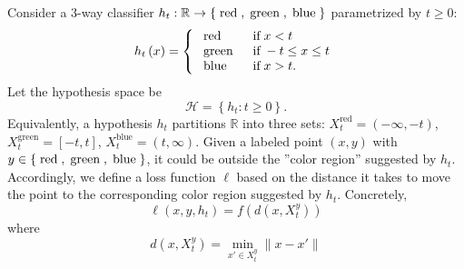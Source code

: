 \documentclass{article}
\def\H{\mathcal H}
\def\R{\mathbb R}
\begin{document}
\begin{figure}[H] \centering {} \label{fig:1dam}
\end{figure}
 Consider a 3-way classifier $h_t: \R \to  \left\{\text{\;red\;}, \text{\;green\;}, \text{\;blue\;}\right\} $ parametrized by $t\ge 0$:
 \begin{equation}
 h_{t}\left(x\right) =\left\{ \begin{array}{ll}
 \text{\;red\;}& \text{\;if\;} x < t  \\
 \text{\;green\;}& \text{\;if\;} -t \leq  x \leq  t \\
 \text{\;blue\;}& \text{\;if\;} x  > t. \\
 \end{array}\right. 
 \end{equation}
 Let the hypothesis space be
 \begin{equation}
 \H = \left\{ h_t : t \geq  0\right\}.
 \end{equation}
 Equivalently, a hypothesis $h_t$ partitions $\R$ into three sets: 
 $X^\text{red}_t = (-\infty, -t)$,
 $X^\text{green}_t = [-t, t]$,
 $X^\text{blue}_t = (t, \infty)$.
 Given a labeled point $(x,y)$ with  $y \in \left\{\text{\;red\;}, \text{\;green\;}, \text{\;blue\;}\right\}$, it could be outside the ''color region'' suggested by $h_t$. 
 Accordingly, we define a loss function $\ell$ based on the distance it takes to move the point to the corresponding color region suggested by $h_t$.
 Concretely,
 \begin{equation}
 \ell\left(x, y, h_t\right) = f(d(x, X^y_t))
 \end{equation}
 where 
 \begin{equation}
 d(x, X^y_t) = \min_{x' \in X^y_t} \|x-x'\|
 \end{equation}
\end{document}
